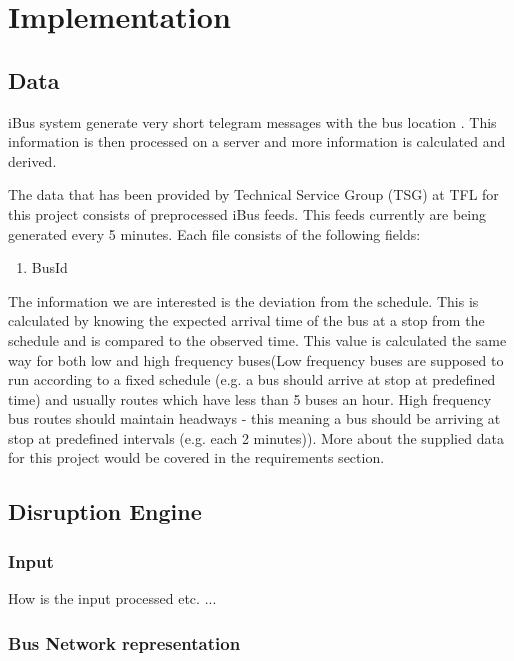 \chapter{Implementation}

\section{Data}
iBus system generate very short telegram messages with the bus location \cite{Hounsell201276}. This information is then processed on a server and more information is calculated and derived.

The data that has been provided by Technical Service Group (TSG) at TFL for this project consists of preprocessed iBus feeds. This feeds currently are being generated every 5 minutes. Each file consists of the following fields:
\begin{enumerate}
\item BusId
\end{enumerate}

The information we are interested is the deviation from the schedule. This is calculated by knowing the expected arrival time of the bus at a stop from the schedule and is compared to the observed time. This value is calculated the same way for both low and high frequency buses(Low frequency buses are supposed to run according to a fixed schedule (e.g. a bus should arrive at stop at predefined time) and usually routes which have less than 5 buses an hour. High frequency bus routes should maintain headways - this meaning a bus should be arriving at stop at predefined intervals (e.g. each 2 minutes)). More about the supplied data for this project would be covered in the requirements section.

\section{Disruption Engine}
	\subsection{Input}
	How is the input processed etc. ...
	\subsection{Bus Network representation}
	
